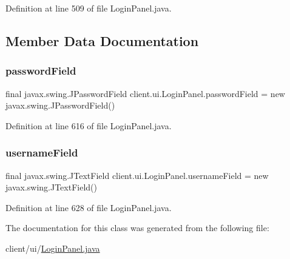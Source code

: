 Definition at line 509 of file Login\+Panel.\+java.



\subsection{Member Data Documentation}
\hypertarget{classclient_1_1ui_1_1_login_panel_a4b3258e8faace6462f58c79cb4a08835}{}\label{classclient_1_1ui_1_1_login_panel_a4b3258e8faace6462f58c79cb4a08835} 
\subsubsection{\texorpdfstring{password\+Field}{passwordField}}
{\footnotesize\ttfamily final javax.\+swing.\+J\+Password\+Field client.\+ui.\+Login\+Panel.\+password\+Field = new javax.\+swing.\+J\+Password\+Field()}



Definition at line 616 of file Login\+Panel.\+java.

\hypertarget{classclient_1_1ui_1_1_login_panel_a3a01950b4312782aa5d78d22d257e19e}{}\label{classclient_1_1ui_1_1_login_panel_a3a01950b4312782aa5d78d22d257e19e} 
\subsubsection{\texorpdfstring{username\+Field}{usernameField}}
{\footnotesize\ttfamily final javax.\+swing.\+J\+Text\+Field client.\+ui.\+Login\+Panel.\+username\+Field = new javax.\+swing.\+J\+Text\+Field()}



Definition at line 628 of file Login\+Panel.\+java.



The documentation for this class was generated from the following file\+:\begin{DoxyCompactItemize}
\item 
client/ui/\hyperlink{_login_panel_8java}{Login\+Panel.\+java}\end{DoxyCompactItemize}

